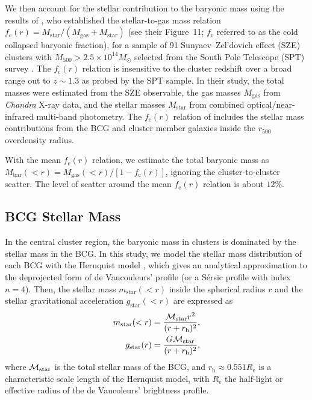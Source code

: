\documentclass[a4paper,iop,twocolumn,twocolappendix,numberedappendix,appendixfloats]{emulateapj}
\newcommand{\percent}{\ensuremath{\%}}
\newcommand{\Mgas}{M_\mathrm{gas}}
\newcommand{\Mbar}{M_\mathrm{bar}}
\newcommand{\Mstar}{M_\mathrm{star}}
\newcommand{\fcold}{f_\mathrm{c}}
\begin{document}
We then account for the stellar contribution to the baryonic mass using
the results of \citet{Chiu18}, who established the stellar-to-gas mass
relation $\fcold(r)=\Mstar/(\Mgas+\Mstar)$ (see their Figure~11;
$\fcold$ referred to as the cold collapsed baryonic fraction),
for a sample of 91 Sunyaev--Zel'dovich effect (SZE) clusters with
$M_{500}>2.5\times 10^{14}M_\odot$
selected from
the South Pole Telescope (SPT) survey \citep{carlstrom2011,bleem2015}.
The $\fcold(r)$ relation is insensitive to the cluster redshift over a
broad range out to $z\sim 1.3$ as probed by the SPT sample.
In their study, the total masses were estimated from the SZE
observable, the gas masses $\Mgas$ from {\em Chandra} X-ray data, and
the stellar masses $\Mstar$ from combined optical/near-infrared
multi-band photometry.
The $\fcold(r)$ relation of \citet{Chiu18} includes the stellar mass
contributions from the BCG and cluster member galaxies inside the
$r_{500}$ overdensity radius.

With the mean $\fcold(r)$ relation, we estimate the total baryonic
mass as $\Mbar(<r) = \Mgas(<r)/[1-\fcold(r)]$, ignoring the
cluster-to-cluster scatter.
The level of scatter around the mean
$\fcold(r)$ relation is about $12\percent$.

\subsection{BCG Stellar Mass}
\label{subsec:BCG}

In the central cluster region, the baryonic mass in clusters is
dominated by the stellar mass in the BCG.
In this study, we model the stellar mass distribution of each BCG
with the Hernquist model \citep{Hernquist90},
 which gives an analytical approximation to the deprojected form of de
 Vaucouleurs' profile (or a S\'ersic profile with index $n=4$).
Then, the stellar mass $m_\mathrm{star}(<r)$ inside the spherical radius
$r$ and the stellar gravitational acceleration $g_\mathrm{star}(<r)$ are
expressed as
\begin{equation}
 \label{eq:Hernquist}
  \begin{aligned}
   m_\mathrm{star}(<r) &=\frac{{\cal M}_\mathrm{star}r^2}{(r+r_\mathrm{h})^2},\\
   g_\mathrm{star}(r)&=\frac{G{\cal M}_\mathrm{star}}{(r+r_\mathrm{h})^2},
   \end{aligned}
\end{equation}
where ${\cal M}_\mathrm{star}$ is the total stellar mass of the BCG, and
$r_\mathrm{h}\approx 0.551 R_\mathrm{e}$
is a characteristic scale length of the Hernquist model,
with $R_\mathrm{e}$ the half-light or effective radius of the de Vaucoleurs'
brightness profile.
\end{document}
